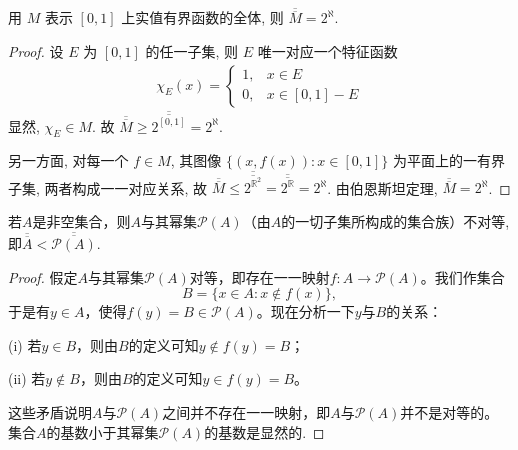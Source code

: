\documentclass[../../main.tex]{subfiles}%
\begin{document}
\begin{example}
用 $M$ 表示 $[0, 1]$ 上实值有界函数的全体, 则 $\overline{\overline{M}} = 2^{\aleph}$.
\end{example}
\begin{proof}
设 $E$ 为 $[0, 1]$ 的任一子集, 则 $E$ 唯一对应一个特征函数
\begin{align*}
\chi_E(x) = 
\begin{cases}
1, & x \in E\\
0, & x \in [0, 1] - E
\end{cases}
\end{align*}
显然, $\chi_E \in M$. 故 $\overline{\overline{M}} \geqslant \overline{\overline{2^{[0, 1]}}} = 2^{\aleph}$.

另一方面, 对每一个 $f \in M$, 其图像 $\{(x, f(x)) : x \in [0, 1]\}$ 为平面上的一有界子集, 两者构成一一对应关系, 故 $\overline{\overline{M}} \leqslant \overline{\overline{2^{\mathbb{R}^2}}} = \overline{\overline{2^{\mathbb{R}}}} = 2^{\aleph}$. 由伯恩斯坦定理, $\overline{\overline{M}} = 2^{\aleph}$. 
\end{proof}

\begin{theorem}[无最大基数定理]\label{theorem:无最大基数定理1}
若\(A\)是非空集合，则\(A\)与其幂集\(\mathcal{P}(A)\)（由\(A\)的一切子集所构成的集合族）不对等,即$\overline{\overline{A}} < \overline{\overline{\mathcal{P}(A)}}$.
\end{theorem}
\begin{proof}
假定\(A\)与其幂集\(\mathcal{P}(A)\)对等，即存在一一映射\(f:A\rightarrow\mathcal{P}(A)\)。我们作集合
\[B = \{x\in A:x\notin f(x)\},\]
于是有\(y\in A\)，使得\(f(y)=B\in\mathcal{P}(A)\)。现在分析一下\(y\)与\(B\)的关系：

(i) 若\(y\in B\)，则由\(B\)的定义可知\(y\notin f(y)=B\)；

(ii) 若\(y\notin B\)，则由\(B\)的定义可知\(y\in f(y)=B\)。

这些矛盾说明\(A\)与\(\mathcal{P}(A)\)之间并不存在一一映射，即\(A\)与\(\mathcal{P}(A)\)并不是对等的。集合\(A\)的基数小于其幂集\(\mathcal{P}(A)\)的基数是显然的.
\end{proof}
\end{document}
